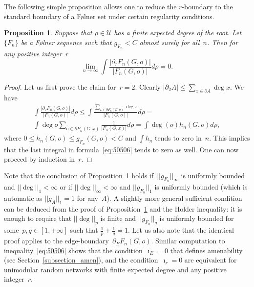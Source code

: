 \documentclass[10pt,a4paper]{amsart}
\newtheorem{proposition}[lemma]{Proposition}
\begin{document}
The following simple proposition allows one to reduce the $r$-boundary to the standard boundary of a F\o lner set under certain regularity conditions. 
\begin{proposition}\label{proposition:rFolnler}%
    Suppose that $\rho \in \mathcal{U}$ has a finite expected degree of the root. Let $\{F_n\}$ be a F\o lner sequence such that $g_{F_n}< C$ almost surely for all~$n$. Then for any positive integer~$r$
    $$
    \lim_{n \to \infty} \int \frac{|\partial_r F_n (G,o)|}{|F_n(G,o)|} d\rho= 0.
    $$
\end{proposition}
\begin{proof}
    Let us first prove the claim for~$r = 2$. Clearly $|\partial_2 A| \le \sum_{x \in \partial A} \deg x$. We have 
    \begin{multline}\label{eq:50506}
         \int \frac{|\partial_2 F_n (G,o)|}{|F_n(G,o)|} d\rho \le 
         \int \frac{\sum_{x \in \partial F_n(G,o)} \deg x}{|F_n(G,o)|} d\rho = \\
         \int \deg o\sum_{o \in \partial F_n(G,x)} \frac{1}{|F_n(G,x)|} d\rho = 
         \int \deg (o) h_n(G,o) d\rho,
    \end{multline}
    where $0\le h_n(G,o) \le g_{F_n}(G,o) < C$ and $\int h_n$ tends to zero in~$n$. This implies that the last integral in formula~\eqref{eq:50506} tends to zero as well. 
One can now proceed by induction in~$r$.
\end{proof}
Note that the conclusion of Proposition~\ref{proposition:rFolnler} holds if~$||g_{F_n}||_\infty$ is uniformly bounded and $||\deg||_1 < \infty$ or if $||\deg ||_\infty < \infty$ and $||g_{F_n}||_1$ is uniformly bounded (which is automatic as $||g_{A}||_1 = 1$ for any~$A$). A slightly more general sufficient condition can be deduced from the proof of Proposition~\ref{proposition:rFolnler} and the Holder inequality: it is enough to require that $||\deg||_p$ is finite and $||g_{F_n}||_q$ is uniformly bounded for some~$p, q \in [1, +\infty]$ such that $\frac{1}{p} + \frac{1}{q} = 1$. Let us also note that the identical  proof applies to the {edge-boundary}~$\partial_E F_n(G,o)$.
Similar computation to inequality~\eqref{eq:50506} shows that the condition~$\imath_E= 0$ that defines amenability (see Section~\ref{subsection_amen}), and the condition~$\imath_r =0$ are equivalent for unimodular random networks with finite expected degree and any positive integer~$r$.
\end{document}

